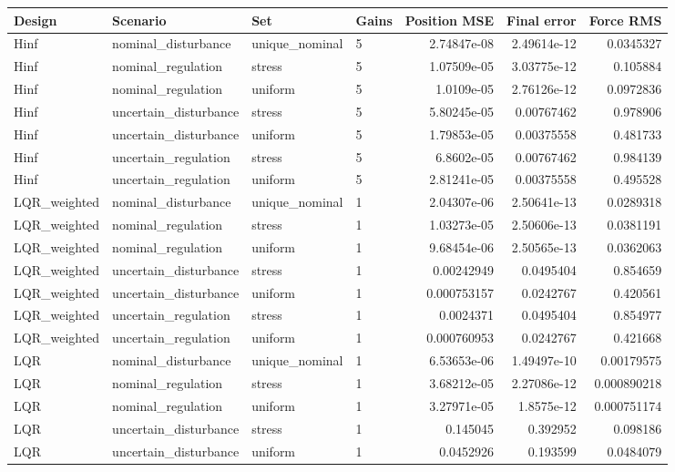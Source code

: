 \begin{tabular}{llllrrr}
\hline
Design & Scenario & Set & Gains & Position MSE & Final error & Force RMS \\
\hline
Hinf & nominal\_disturbance & unique\_nominal & 5 & 2.74847e-08 & 2.49614e-12 & 0.0345327 \\
Hinf & nominal\_regulation & stress & 5 & 1.07509e-05 & 3.03775e-12 & 0.105884 \\
Hinf & nominal\_regulation & uniform & 5 & 1.0109e-05 & 2.76126e-12 & 0.0972836 \\
Hinf & uncertain\_disturbance & stress & 5 & 5.80245e-05 & 0.00767462 & 0.978906 \\
Hinf & uncertain\_disturbance & uniform & 5 & 1.79853e-05 & 0.00375558 & 0.481733 \\
Hinf & uncertain\_regulation & stress & 5 & 6.8602e-05 & 0.00767462 & 0.984139 \\
Hinf & uncertain\_regulation & uniform & 5 & 2.81241e-05 & 0.00375558 & 0.495528 \\
LQR\_weighted & nominal\_disturbance & unique\_nominal & 1 & 2.04307e-06 & 2.50641e-13 & 0.0289318 \\
LQR\_weighted & nominal\_regulation & stress & 1 & 1.03273e-05 & 2.50606e-13 & 0.0381191 \\
LQR\_weighted & nominal\_regulation & uniform & 1 & 9.68454e-06 & 2.50565e-13 & 0.0362063 \\
LQR\_weighted & uncertain\_disturbance & stress & 1 & 0.00242949 & 0.0495404 & 0.854659 \\
LQR\_weighted & uncertain\_disturbance & uniform & 1 & 0.000753157 & 0.0242767 & 0.420561 \\
LQR\_weighted & uncertain\_regulation & stress & 1 & 0.0024371 & 0.0495404 & 0.854977 \\
LQR\_weighted & uncertain\_regulation & uniform & 1 & 0.000760953 & 0.0242767 & 0.421668 \\
LQR & nominal\_disturbance & unique\_nominal & 1 & 6.53653e-06 & 1.49497e-10 & 0.00179575 \\
LQR & nominal\_regulation & stress & 1 & 3.68212e-05 & 2.27086e-12 & 0.000890218 \\
LQR & nominal\_regulation & uniform & 1 & 3.27971e-05 & 1.8575e-12 & 0.000751174 \\
LQR & uncertain\_disturbance & stress & 1 & 0.145045 & 0.392952 & 0.098186 \\
LQR & uncertain\_disturbance & uniform & 1 & 0.0452926 & 0.193599 & 0.0484079 \\

\end{tabular}
